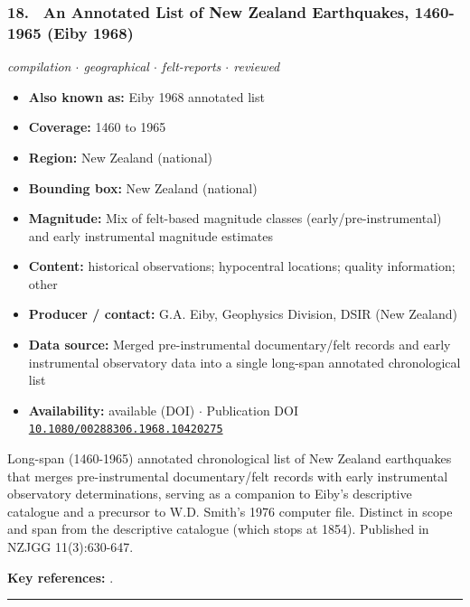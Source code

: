 \documentclass[10pt,a4paper]{article}
\newcommand{\catentryrule}{\par\vspace{3pt}\noindent\textcolor{rulegrey}{\rule{\linewidth}{0.3pt}}\par\vspace{5pt}}
\newcommand{\kv}[2]{\item \textbf{#1:} #2}
\begin{document}
\subsubsection*{\hypertarget{c:18}{18.}~ An Annotated List of New Zealand Earthquakes, 1460-1965 (Eiby 1968)}
{\small\itshape compilation $\cdot$ geographical $\cdot$ felt-reports $\cdot$ reviewed}\par\vspace{2pt}
\begin{itemize}[leftmargin=1.3em,itemsep=0.6pt,topsep=1pt,parsep=0pt]
\kv{Also known as}{Eiby 1968 annotated list}
\kv{Coverage}{1460 to 1965}
\kv{Region}{New Zealand (national)}
\kv{Bounding box}{New Zealand (national)}
\kv{Magnitude}{Mix of felt-based magnitude classes (early/pre-instrumental) and early instrumental magnitude estimates}
\kv{Content}{historical observations; hypocentral locations; quality information; other}
\kv{Producer / contact}{G.A. Eiby, Geophysics Division, DSIR (New Zealand)}
\kv{Data source}{Merged pre-instrumental documentary/felt records and early instrumental observatory data into a single long-span annotated chronological list}
\kv{Availability}{available (DOI) $\cdot$ Publication DOI \href{https://doi.org/10.1080/00288306.1968.10420275}{\nolinkurl{10.1080/00288306.1968.10420275}}}
\end{itemize}
\par\vspace{2pt}Long-span (1460-1965) annotated chronological list of New Zealand earthquakes that merges pre-instrumental documentary/felt records with early instrumental observatory determinations, serving as a companion to Eiby's descriptive catalogue and a precursor to W.D. Smith's 1976 computer file. Distinct in scope and span from the descriptive catalogue (which stops at 1854). Published in NZJGG 11(3):630-647.
\par\vspace{2pt}\textbf{Key references:} \cite{Eiby1968a}.
\catentryrule
\end{document}
